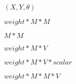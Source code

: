\documentclass{article}
\begin{document}
$ (X,Y,\theta) $
\pagebreak

$ weight*M*M $
\pagebreak

$ M*M $
\pagebreak

$ weight*M*V $
\pagebreak

$ weight*M*V*scalar $
\pagebreak

$ weight*M*M*V $
\pagebreak
\end{document}
